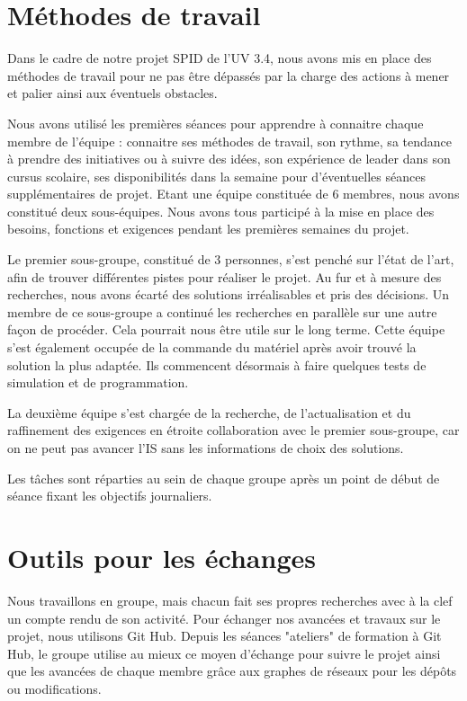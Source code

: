 
\chapter{Méthodes de travail}

Dans le cadre de notre projet SPID de l’UV 3.4, nous avons mis en place des méthodes de travail pour ne pas être dépassés par la charge des actions à mener et palier ainsi aux éventuels obstacles.  

Nous avons utilisé les premières séances pour apprendre à connaitre chaque membre de l’équipe : connaitre ses méthodes de travail, son rythme, sa tendance à prendre des initiatives ou à suivre des idées, son expérience de leader dans son cursus scolaire, ses disponibilités dans la semaine pour d’éventuelles séances supplémentaires de projet. 
Etant une équipe constituée de 6 membres, nous avons constitué deux sous-équipes. Nous avons tous participé à la mise en place des besoins, fonctions et exigences pendant les premières semaines du projet. 

Le premier sous-groupe, constitué de 3 personnes, s’est penché sur l’état de l’art, afin de trouver différentes pistes pour réaliser le projet. Au fur et à mesure des recherches, nous avons écarté des solutions irréalisables et pris des décisions. Un membre de ce sous-groupe a continué les recherches en parallèle sur une autre façon de procéder. Cela pourrait nous être utile sur le long terme. 
Cette équipe s’est également occupée de la commande du matériel après avoir trouvé la solution la plus adaptée. Ils commencent désormais à faire quelques tests de simulation et de programmation.

La deuxième équipe s'est chargée de la recherche, de l'actualisation et du raffinement des exigences en étroite collaboration avec le premier sous-groupe, car on ne peut pas avancer l’IS sans les informations de choix des solutions. 

Les tâches sont réparties au sein de chaque groupe après un point de début de séance fixant les objectifs journaliers.

\chapter{Outils pour les échanges}

Nous travaillons en groupe, mais chacun fait ses propres recherches avec à la clef un compte rendu de son activité. Pour échanger nos avancées et travaux sur le projet, nous utilisons Git Hub. Depuis les séances "ateliers" de formation à Git Hub, le groupe utilise au mieux ce moyen d'échange pour suivre le projet ainsi que les avancées de chaque membre grâce aux graphes de réseaux pour les dépôts ou modifications. 


